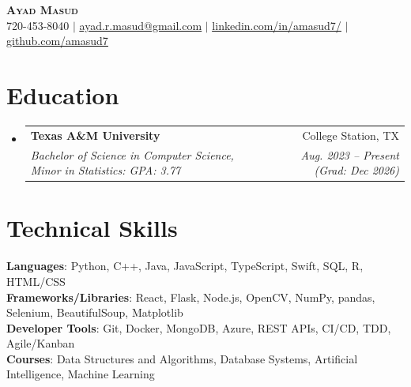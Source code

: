 \documentclass[letterpaper,10pt]{article}
\makeatletter
\newcommand{\resumeSubheading}[4]{
  \vspace{-0.5pt}\item
    \begin{tabular*}{0.97\textwidth}[t]{l@{\extracolsep{\fill}}r}
      \textbf{#1} & #2 \\
      \textit{\small#3} & \textit{\small #4} \\
    \end{tabular*}\vspace{-6pt}
}
\newcommand{\resumeSubHeadingListStart}{\begin{itemize}[leftmargin=0.15in, label={}, itemsep=0pt]}
\newcommand{\resumeSubHeadingListEnd}{\end{itemize}}
\makeatother
\begin{document}

\begin{center}
    \textbf{\Huge \scshape Ayad Masud} \\ \vspace{1pt}
    \small 720-453-8040 $|$ \href{mailto:ayad.r.masud@gmail.com}{\underline{ayad.r.masud@gmail.com}} $|$ 
    \href{https://linkedin.com/in/amasud7}{\underline{linkedin.com/in/amasud7/}} $|$
    \href{https://github.com/amasud7}{\underline{github.com/amasud7}}
\end{center}


\section{Education}
  \resumeSubHeadingListStart
    \resumeSubheading
      {Texas A\&M University}{College Station, TX}
      {Bachelor of Science in Computer Science, Minor in Statistics: GPA: 3.77}{Aug. 2023 -- Present (Grad: Dec 2026)}
  \resumeSubHeadingListEnd


\section{Technical Skills}
\begin{itemize}[leftmargin=0.15in, label={}]
   \small{\item{
    \textbf{Languages}{: Python, C++, Java, JavaScript, TypeScript, Swift, SQL, R, HTML/CSS} \\
    \textbf{Frameworks/Libraries}{: React, Flask, Node.js, OpenCV, NumPy, pandas, Selenium, BeautifulSoup, Matplotlib} \\
    \textbf{Developer Tools}{: Git, Docker, MongoDB, Azure, REST APIs, CI/CD, TDD, Agile/Kanban} \\
    \textbf{Courses}{: Data Structures and Algorithms, Database Systems, Artificial Intelligence, Machine Learning}
   }}
\end{itemize}
\end{document}
